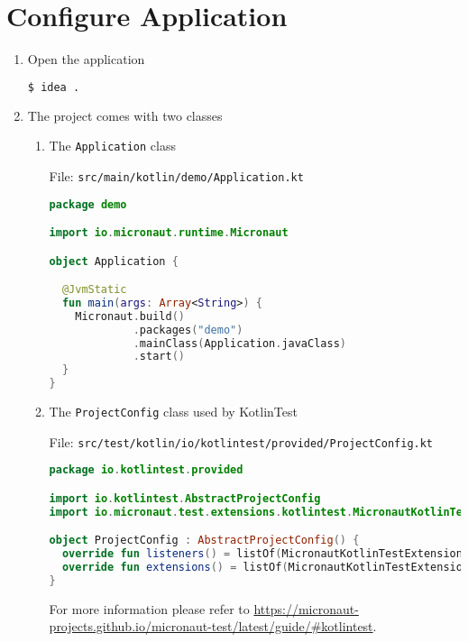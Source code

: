 \section{Configure Application}\label{sec:configuration}

\begin{enumerate}

\item Open the application

\begin{lstlisting}[language=bash]
$ idea .
\end{lstlisting}

\item The project comes with two classes

\begin{enumerate}
\item The \texttt{Application} class

File: \texttt{src/main/kotlin/demo/Application.kt}

\begin{lstlisting}[language=Kotlin]
package demo

import io.micronaut.runtime.Micronaut

object Application {

  @JvmStatic
  fun main(args: Array<String>) {
    Micronaut.build()
             .packages("demo")
             .mainClass(Application.javaClass)
             .start()
  }
}
\end{lstlisting}

\item The \texttt{ProjectConfig} class used by KotlinTest

File: \texttt{src/test/kotlin/io/kotlintest/provided/ProjectConfig.kt}

\begin{lstlisting}[language=Kotlin]
package io.kotlintest.provided

import io.kotlintest.AbstractProjectConfig
import io.micronaut.test.extensions.kotlintest.MicronautKotlinTestExtension

object ProjectConfig : AbstractProjectConfig() {
  override fun listeners() = listOf(MicronautKotlinTestExtension)
  override fun extensions() = listOf(MicronautKotlinTestExtension)
}
\end{lstlisting}

For more information please refer to \url{https://micronaut-projects.github.io/micronaut-test/latest/guide/\#kotlintest}.

\end{enumerate}


\end{enumerate}
